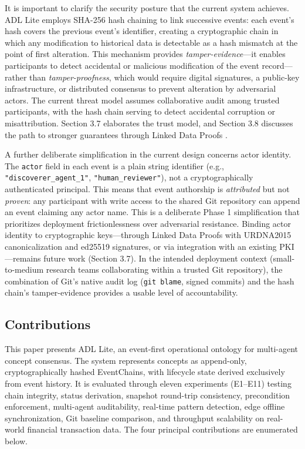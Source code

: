 It is important to clarify the security posture that the current system achieves. ADL Lite employs SHA-256 hash chaining to link successive events: each event's hash covers the previous event's identifier, creating a cryptographic chain in which any modification to historical data is detectable as a hash mismatch at the point of first alteration. This mechanism provides \emph{tamper-evidence}---it enables participants to detect accidental or malicious modification of the event record---rather than \emph{tamper-proofness}, which would require digital signatures, a public-key infrastructure, or distributed consensus to prevent alteration by adversarial actors. The current threat model assumes collaborative audit among trusted participants, with the hash chain serving to detect accidental corruption or misattribution. Section 3.7 elaborates the trust model, and Section 3.8 discusses the path to stronger guarantees through Linked Data Proofs \cite{ref21}.

A further deliberate simplification in the current design concerns actor identity. The \texttt{actor} field in each event is a plain string identifier (e.g., \texttt{"discoverer\_agent\_1"}, \texttt{"human\_reviewer"}), not a cryptographically authenticated principal. This means that event authorship is \emph{attributed} but not \emph{proven}: any participant with write access to the shared Git repository can append an event claiming any actor name. This is a deliberate Phase 1 simplification that prioritizes deployment frictionlessness over adversarial resistance. Binding actor identity to cryptographic keys---through Linked Data Proofs with URDNA2015 canonicalization and ed25519 signatures, or via integration with an existing PKI---remains future work (Section 3.7). In the intended deployment context (small-to-medium research teams collaborating within a trusted Git repository), the combination of Git's native audit log (\texttt{git\ blame}, signed commits) and the hash chain's tamper-evidence provides a usable level of accountability.

\subsection{Contributions}\label{contributions}

This paper presents ADL Lite, an event-first operational ontology for multi-agent concept consensus. The system represents concepts as append-only, cryptographically hashed EventChains, with lifecycle state derived exclusively from event history. It is evaluated through eleven experiments (E1--E11) testing chain integrity, status derivation, snapshot round-trip consistency, precondition enforcement, multi-agent auditability, real-time pattern detection, edge offline synchronization, Git baseline comparison, and throughput scalability on real-world financial transaction data. The four principal contributions are enumerated below.


